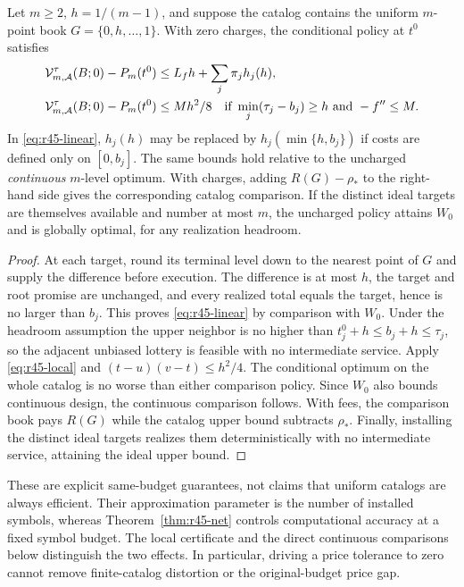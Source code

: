 \begin{proposition}\label{prop:r45-rates}
Let $m\geq2$, $h=1/(m-1)$, and suppose the catalog contains the uniform $m$-point book $G=\{0,h,\ldots,1\}$. With zero charges, the conditional policy at $t^0$ satisfies
\begin{align}
 \mathcal V_{m,\mathcal A}^{\tau}(B;0)-P_m(t^0)
 &\leq L_fh+\sum_j\pi_jh_j(h),\label{eq:r45-linear}\\
 \mathcal V_{m,\mathcal A}^{\tau}(B;0)-P_m(t^0)
 &\leq Mh^2/8
 \quad\hbox{if }\min_j(\tau_j-b_j)\geq h
 \hbox{ and }-f''\leq M.\label{eq:r45-quadratic}
\end{align}
In \eqref{eq:r45-linear}, $h_j(h)$ may be replaced by $h_j(\min\{h,b_j\})$ if costs are defined only on $[0,b_j]$. The same bounds hold relative to the uncharged \emph{continuous} $m$-level optimum. With charges, adding $R(G)-\rho_*$ to the right-hand side gives the corresponding catalog comparison. If the distinct ideal targets are themselves available and number at most $m$, the uncharged policy attains $W_0$ and is globally optimal, for any realization headroom.
\end{proposition}
\begin{proof}
At each target, round its terminal level down to the nearest point of $G$ and supply the difference before execution. The difference is at most $h$, the target and root promise are unchanged, and every realized total equals the target, hence is no larger than $b_j$. This proves \eqref{eq:r45-linear} by comparison with $W_0$. Under the headroom assumption the upper neighbor is no higher than $t_j^0+h\leq b_j+h\leq\tau_j$, so the adjacent unbiased lottery is feasible with no intermediate service. Apply \eqref{eq:r45-local} and $(t-u)(v-t)\leq h^2/4$. The conditional optimum on the whole catalog is no worse than either comparison policy. Since $W_0$ also bounds continuous design, the continuous comparison follows. With fees, the comparison book pays $R(G)$ while the catalog upper bound subtracts $\rho_*$. Finally, installing the distinct ideal targets realizes them deterministically with no intermediate service, attaining the ideal upper bound.
\end{proof}

These are explicit same-budget guarantees, not claims that uniform catalogs are always efficient. Their approximation parameter is the number of installed symbols, whereas Theorem~\ref{thm:r45-net} controls computational accuracy at a fixed symbol budget. The local certificate and the direct continuous comparisons below distinguish the two effects. In particular, driving a price tolerance to zero cannot remove finite-catalog distortion or the original-budget price gap.
